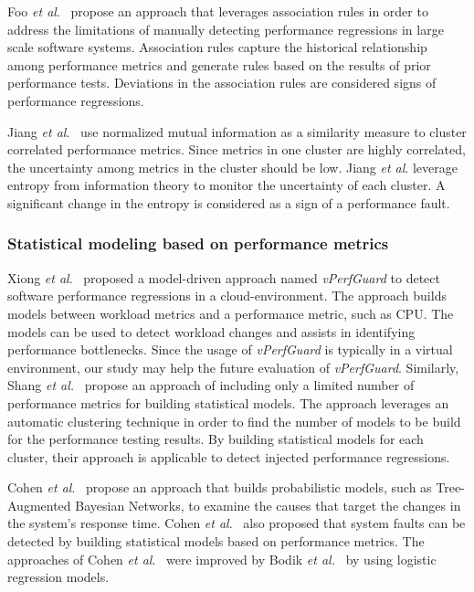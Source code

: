 Foo \emph{ et al$.$}~\cite{foo2010mining} propose an approach that leverages association rules in order to address the limitations of manually detecting performance regressions in large scale software systems. Association rules capture the historical relationship among performance metrics and generate rules based on the results of prior performance tests. Deviations in the association rules are considered signs of performance regressions.

Jiang \emph{et al$.$}~\cite{5270324} use normalized mutual information as a similarity measure to cluster correlated performance metrics. Since metrics in one cluster are highly correlated, the uncertainty among metrics in the cluster should be low. Jiang \emph{et al$.$} leverage entropy from information theory to monitor the uncertainty of each cluster. A significant change in the entropy is considered as a sign of a performance fault. 


\subsubsection{Statistical modeling based on performance metrics}
\label{sec:relatedmodel}

Xiong \textit{et al$.$}~\cite{xiong2013vperfguard} proposed a model-driven approach named \textit{vPerfGuard} to detect software performance regressions in a cloud-environment. The approach builds models between workload metrics and a performance metric, such as CPU. The models can be used to detect workload changes and assists in identifying performance bottlenecks. Since the usage of \emph{vPerfGuard} is typically in a virtual environment, our study may help the future evaluation of \textit{vPerfGuard}. Similarly, Shang \textit{ et al.}~\cite{Shang:2015:ADP:2668930.2688052} propose an approach of including only a limited number of performance metrics for building statistical models. The approach leverages an automatic clustering technique in order to find the number of models to be build for the performance testing results. By building statistical models for each cluster, their approach is applicable to detect injected performance regressions. 

Cohen \textit{et al$.$}~\cite{cohen2004correlating} propose an approach that builds probabilistic models, such as Tree-Augmented Bayesian Networks, to examine the causes that target the changes in the system's response time. Cohen \textit{et al$.$}~\cite{Cohen:2005:CIC:1095810.1095821} also proposed that system faults can be detected by building statistical models based on performance metrics. The approaches of Cohen \textit{et al$.$}~\cite{cohen2004correlating, Cohen:2005:CIC:1095810.1095821} were improved by Bodik \textit{et al.}~\cite{bodik2008hilighter} by using logistic regression models.

